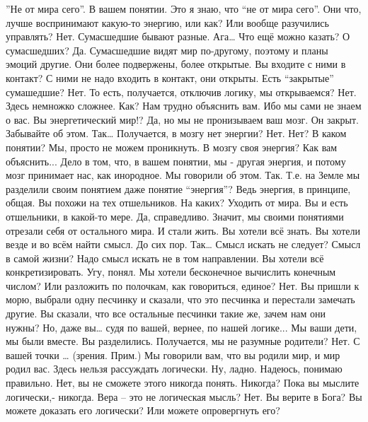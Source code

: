 \documentclass{extbook}
\newcommand{\soul}[1]{{#1}}
\newcommand{\people}[1]{{#1}}
\begin{document}
\soul{''Не от мира сего''. В вашем понятии.}
\people{Это я  знаю, что ``не от мира сего''. Они что, лучше воспринимают какую-то энергию, или как? Или вообще разучились управлять?}
\soul{Нет. Сумасшедшие бывают разные.}
\people{Ага… Что ещё можно казать?}
\soul{О сумасшедших?}
\people{Да.}
\soul{Сумасшедшие видят мир по-другому, поэтому и планы эмоций другие. Они более подвержены, более открытые.}
\people{Вы входите с ними в контакт?}
\soul{С ними не надо входить в контакт, они открыты.}
\people{Есть ``закрытые''  сумашедшие?}
\soul{Нет.}
\people{То есть, получается, отключив логику, мы открываемся?}
\soul{Нет. Здесь немножко сложнее.}
\people{Как?}
\soul{Нам трудно объяснить вам. Ибо мы сами не знаем о вас.}
\people{Вы  энергетический мир!?}
\soul{Да, но мы не пронизываем ваш мозг. Он закрыт. Забывайте об этом.}
\people{Так… Получается, в мозгу нет энергии?}
\soul{Нет.}
\people{Нет? В каком понятии?}
\soul{Мы, просто не можем проникнуть.}
\people{В мозгу своя энергия?}
\soul{Как вам объяснить... Дело в том, что, в вашем понятии, мы - другая энергия, и  потому  мозг принимает нас, как инородное. Мы говорили об этом.}
\people{Так. Т.е. на Земле мы разделили своим понятием даже понятие ``энергия''? Ведь энергия, в принципе, общая.}
\soul{Вы похожи на тех отшельников.}
\people{На каких?}
\soul{Уходить от  мира. Вы и есть отшельники, в какой-то мере. }
\people{Да, справедливо. Значит, мы своими понятиями отрезали себя от остального мира. И стали жить.}
\soul{Вы хотели всё знать. Вы хотели везде и во всём найти смысл.}
\people{До сих пор. Так… Смысл искать не следует? Смысл  в  самой жизни?}
\soul{Надо смысл искать не в том  направлении. Вы хотели всё конкретизировать.}
\people{Угу, понял. Мы хотели бесконечное вычислить конечным числом? Или разложить по полочкам, как говориться, единое?}
\soul{Нет. Вы пришли к морю, выбрали одну песчинку и сказали, что это песчинка и перестали замечать другие. Вы сказали, что все остальные песчинки такие же, зачем нам они нужны?}
\people{Но, даже вы… судя по вашей, вернее, по нашей логике...}
\soul{Мы ваши дети, мы были вместе. Вы разделились.}
\people{Получается, мы не разумные родители?}
\soul{Нет. }
\people{С вашей точки … (зрения. Прим.)}
\soul{Мы говорили вам, что вы родили мир,  и мир родил вас. Здесь нельзя рассуждать логически.}
\people{Ну, ладно. Надеюсь, понимаю правильно.}
\soul{Нет, вы не сможете этого никогда понять. }
\people{Никогда?}
\soul{Пока вы мыслите логически,- никогда.}
\people{Вера – это не логическая  мысль?}
\soul{Нет. Вы верите в Бога? Вы можете доказать его логически? Или можете опровергнуть его? }
\end{document}
